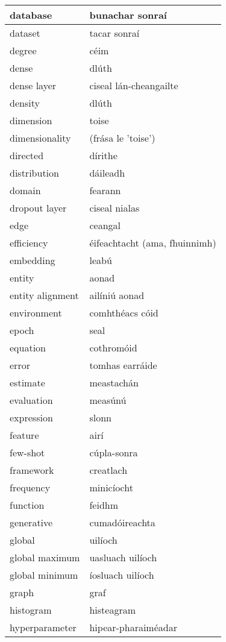 \documentclass{article}
\begin{document}
\begin{longtable}{|l|l|}
		database&bunachar sonraí\\ \hline 
		dataset&tacar sonraí\\ \hline 
		degree&céim\\ \hline 
		dense&dlúth\\ \hline 
		dense layer&ciseal lán-cheangailte\\ \hline 
		density&dlúth\\ \hline 
		dimension&toise\\ \hline 
		dimensionality&(frása le 'toise')\\ \hline 
		directed&dírithe\\ \hline 
		distribution&dáileadh\\ \hline 
		domain&fearann\\ \hline 
		dropout layer&ciseal nialas\\ \hline 
		edge&ceangal\\ \hline 
		efficiency&éifeachtacht (ama, fhuinnimh)\\ \hline 
		embedding&leabú\\ \hline 
		entity&aonad\\ \hline 
		entity alignment&ailíniú aonad\\ \hline 
		environment&comhthéacs cóid\\ \hline 
		epoch&seal\\ \hline 
		equation&cothromóid\\ \hline 
		error&tomhas earráide\\ \hline 
		estimate&meastachán\\ \hline 
		evaluation&measúnú\\ \hline 
		expression&slonn\\ \hline 
		feature&airí\\ \hline 
		few-shot&cúpla-sonra\\ \hline 
		framework&creatlach\\ \hline 
		frequency&minicíocht\\ \hline 
		function&feidhm\\ \hline 
		generative&cumadóireachta\\ \hline 
		global&uilíoch\\ \hline 
		global maximum&uasluach uilíoch\\ \hline 
		global minimum&íosluach uilíoch\\ \hline 
		graph&graf\\ \hline 
		histogram&histeagram\\ \hline 
		hyperparameter&hipear-pharaiméadar\\ \hline 

\end{longtable}
\end{document}
